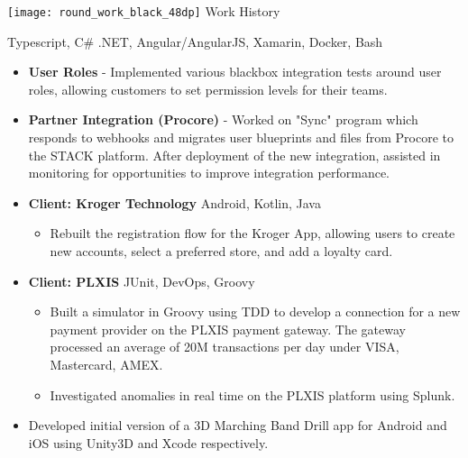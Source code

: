 {\noindent \texttt{[image: round\_work\_black\_48dp]} \hspace{0.25pc}  \large Work History}\hspace{1pc}{\noindent\rule{36.75pc}{0.4pt}}

\vspace{1pc}


{\color{gray} Typescript, C\# .NET, Angular/AngularJS, Xamarin, Docker, Bash}

\begin{itemize}
	\item \textbf{User Roles} - Implemented various blackbox integration tests around user roles, allowing customers to set permission levels for their teams.
	\item \textbf{Partner Integration (Procore)} - Worked on "Sync" program which responds to webhooks and migrates user blueprints and files from Procore to the STACK platform.
	After deployment of the new integration, assisted in monitoring for opportunities to improve integration performance.
\end{itemize}


\begin{itemize}
	\item \textbf{Client: Kroger Technology} \hspace{0.5pc} {\color{gray}Android, Kotlin, Java}
	\begin{itemize}
		\item Rebuilt the registration flow for the Kroger App, allowing users to create new accounts, select a preferred store, and add a loyalty card. 
	\end{itemize}
	\item \textbf{Client: PLXIS} \hspace{0.5pc} {\color{gray} JUnit, DevOps, Groovy}
	\begin{itemize}
		\item Built a simulator in Groovy using TDD to develop a connection for a new payment provider on the PLXIS payment gateway. The gateway processed an average of 20M transactions per day under VISA, Mastercard, AMEX.
		
		\item Investigated anomalies in real time on the PLXIS platform using Splunk.
	\end{itemize}
	
\end{itemize}

\begin{itemize}
	\item Developed initial version of a 3D Marching Band Drill app for Android and iOS using Unity3D and Xcode respectively.
\end{itemize}
